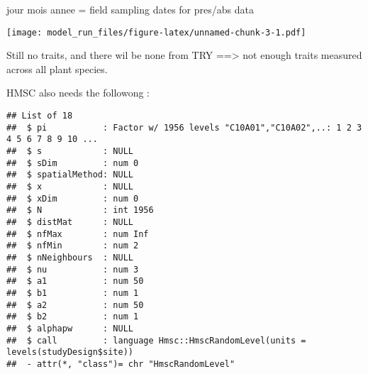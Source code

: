 \documentclass[
]{article}
\newenvironment{Shaded}{\begin{snugshade}}{\end{snugshade}}
\newcommand{\AttributeTok}[1]{\textcolor[rgb]{0.77,0.63,0.00}{#1}}
\newcommand{\CommentTok}[1]{\textcolor[rgb]{0.56,0.35,0.01}{\textit{#1}}}
\newcommand{\FunctionTok}[1]{\textcolor[rgb]{0.00,0.00,0.00}{#1}}
\newcommand{\NormalTok}[1]{#1}
\newcommand{\OtherTok}[1]{\textcolor[rgb]{0.56,0.35,0.01}{#1}}
\newcommand{\SpecialCharTok}[1]{\textcolor[rgb]{0.00,0.00,0.00}{#1}}
\newcommand{\StringTok}[1]{\textcolor[rgb]{0.31,0.60,0.02}{#1}}
\begin{document}
jour mois annee = field sampling dates for pres/abs data

\begin{Shaded}
\end{Shaded}

\texttt{[image: model\_run\_files/figure-latex/unnamed-chunk-3-1.pdf]}

Still no traits, and there wil be none from TRY ==\textgreater{} not
enough traits measured across all plant species.

HMSC also needs the followong :

\begin{Shaded}
\end{Shaded}

\begin{verbatim}
## List of 18
##  $ pi           : Factor w/ 1956 levels "C10A01","C10A02",..: 1 2 3 4 5 6 7 8 9 10 ...
##  $ s            : NULL
##  $ sDim         : num 0
##  $ spatialMethod: NULL
##  $ x            : NULL
##  $ xDim         : num 0
##  $ N            : int 1956
##  $ distMat      : NULL
##  $ nfMax        : num Inf
##  $ nfMin        : num 2
##  $ nNeighbours  : NULL
##  $ nu           : num 3
##  $ a1           : num 50
##  $ b1           : num 1
##  $ a2           : num 50
##  $ b2           : num 1
##  $ alphapw      : NULL
##  $ call         : language Hmsc::HmscRandomLevel(units = levels(studyDesign$site))
##  - attr(*, "class")= chr "HmscRandomLevel"
\end{verbatim}
\end{document}
